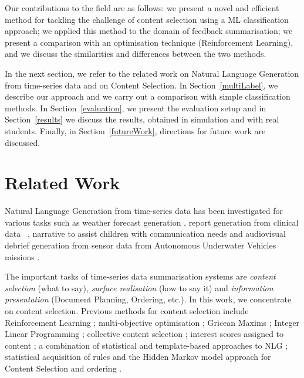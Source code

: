 \documentclass[11pt]{article}
\begin{document}
Our contributions to the field are as follows:
we present a novel and efficient method for tackling the challenge of content selection using a 
ML classification approach; we applied 
this method to the domain of feedback summarisation; we present a comparison with 
an optimisation technique (Reinforcement Learning), and we 
discuss the similarities and differences between the two methods.

In the next section, we refer to the related work on Natural Language Generation 
from time-series data and on Content Selection. 
In Section~\ref{multiLabel}, we describe our approach and we carry out a comparison
with simple classification methods. In Section~\ref{evaluation}, we present the evaluation 
setup and in Section~\ref{results} we discuss the results, obtained in simulation and 
with real students.
Finally, in Section~\ref{futureWork}, directions for future work are discussed. 

\section{Related Work}

Natural Language Generation from time-series data has been investigated 
for various tasks such as weather forecast generation \cite{BelzKow2010,Angeli2010,Sripada2004}, 
report generation from clinical data ~\cite{Hunter2011,Gatt2009}, 
narrative to assist children with 
communication needs \cite{Black2010} and audiovisual debrief generation 
from sensor data from Autonomous Underwater Vehicles missions \cite{Johnson2011}.

The important tasks of time-series data summarisation systems are \textit{content selection} (what to say),
\textit{ surface realisation} (how to say it) and \textit{information presentation} (Document Planning, Ordering, etc.).
 In this work, we concentrate on content selection. Previous
 methods for content selection include Reinforcement Learning \cite{Rieser2010}; multi-objective optimisation \cite{Gkatzia2014};
 Gricean Maxims \cite{Sripada2003}; Integer Linear Programming \cite{Lampouras2013}; collective content
 selection \cite{Barzilay2004a}; interest scores assigned to content \cite{Androutsopoulos2013}; a combination of statistical and template-based approaches to 
NLG \cite{Kondadadi2013}; statistical acquisition of rules \cite{Duboue2003} and the 
Hidden Markov model approach for Content Selection 
and ordering \cite{Barzilay2004b}. 
\end{document}
